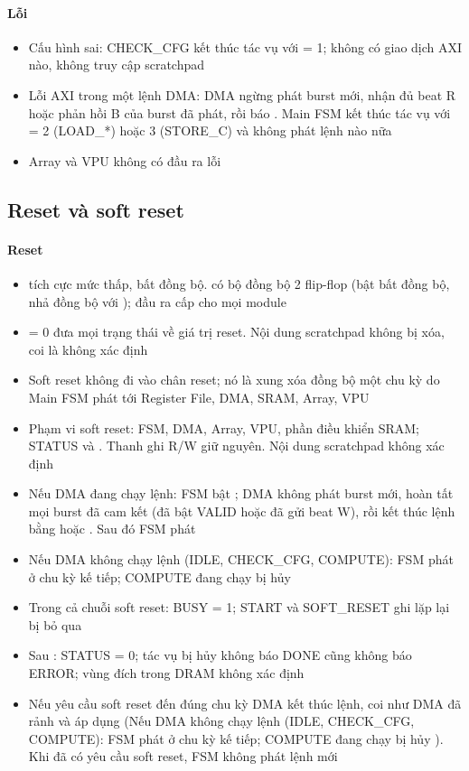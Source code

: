 \paragraph{Lỗi}\label{tab:4-4}
\begin{itemize}
\item Cấu hình sai: CHECK\_CFG kết thúc tác vụ với  = 1; không có giao dịch AXI nào, không truy cập scratchpad
\item Lỗi AXI trong một lệnh DMA: DMA ngừng phát burst mới, nhận đủ beat R hoặc phản hồi B của burst đã phát, rồi báo . Main FSM kết thúc tác vụ với  = 2 (LOAD\_*) hoặc 3 (STORE\_C) và không phát lệnh nào nữa
\item Array và VPU không có đầu ra lỗi
\end{itemize}


\subsection{Reset và soft reset}\label{sec:4.5}


\paragraph{Reset}\label{tab:4-5}
\begin{itemize}
\item {} tích cực mức thấp, bất đồng bộ.  có bộ đồng bộ 2 flip-flop (bật bất đồng bộ, nhả đồng bộ với ); đầu ra  cấp cho mọi module
\item {} = 0 đưa mọi trạng thái về giá trị reset. Nội dung scratchpad không bị xóa, coi là không xác định
\item Soft reset không đi vào chân reset; nó là xung xóa đồng bộ  một chu kỳ do Main FSM phát tới Register File, DMA, SRAM, Array, VPU
\item Phạm vi soft reset: FSM, DMA, Array, VPU, phần điều khiển SRAM; STATUS và . Thanh ghi R/W giữ nguyên. Nội dung scratchpad không xác định
\item Nếu DMA đang chạy lệnh: FSM bật ; DMA không phát burst mới, hoàn tất mọi burst đã cam kết (đã bật VALID hoặc đã gửi beat W), rồi kết thúc lệnh bằng  hoặc . Sau đó FSM phát 
\item Nếu DMA không chạy lệnh (IDLE, CHECK\_CFG, COMPUTE): FSM phát  ở chu kỳ kế tiếp; COMPUTE đang chạy bị hủy
\item Trong cả chuỗi soft reset: BUSY = 1; START và SOFT\_RESET ghi lặp lại bị bỏ qua
\item Sau : STATUS = 0; tác vụ bị hủy không báo DONE cũng không báo ERROR; vùng đích trong DRAM không xác định
\item Nếu yêu cầu soft reset đến đúng chu kỳ DMA kết thúc lệnh, coi như DMA đã rảnh và áp dụng (Nếu DMA không chạy lệnh (IDLE, CHECK\_CFG, COMPUTE): FSM phát  ở chu kỳ kế tiếp; COMPUTE đang chạy bị hủy ). Khi đã có yêu cầu soft reset, FSM không phát lệnh mới
\end{itemize}


